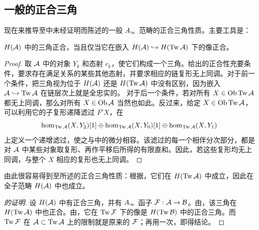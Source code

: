 \subsection{一般的正合三角}\label{sec:3r}
现在来推导至中未经证明而陈述的一般 $\Ai$ 范畴的正合三角性质。主要工具是：
\begin{lemma}\label{st:3.31}
$H(\A)$ 中的三角正合，当且仅当它在嵌入 $H(\A)\hookrightarrow H(\Tw\A)$ 下的像正合。
\end{lemma}
\begin{proof}
取 $\A$ 中的对象 $Y_k$ 和态射 $c_k$，使它们构成一个三角。给出的正合性充要条件，要求存在满足关系的某些其他态射，并要求相应的链复形无上同调。对于前一个条件，把三角视为位于 $H(\A)$ 还是 $H(\Tw\A)$ 中没有区别，因为嵌入 $\A\hookrightarrow\Tw\A$ 在链层次上就是全忠实的。
对于后一个条件，若对所有 $X\in\Ob\Tw\A$ 都无上同调，那么对所有 $X\in\Ob\A$ 当然也如此。反过来，给定 $X\in\Ob\Tw\A$，可以利用它的子复形递降滤过 $F^iX$，在
\[
\hom_{\Tw\A}(X,Y_2)[1]\oplus\hom_{\Tw\A}(X,Y_0)[1]\oplus\hom_{\Tw\A}(X,Y_1)
\]
上定义一个递增滤过，使之与中的微分相容。该滤过的每一个相伴分次部分，都是对 $\A$ 中某些对象取复形、再作平移后所得的有限直和。因此，若这些复形均无上同调，与整个 $X$ 相应的复形也无上同调。
\end{proof}
由此很容易得到至所述的正合三角性质：根据，它们在 $H(\Tw\A)$ 中成立，因此在全子范畴 $H(\A)$ 中也成立。

\begin{proof}[的证明]
设 $H(\A)$ 中有正合三角，并有 $\Ai$ 函子 $\F:\A\to\B$。由，该三角在 $H(\Tw\A)$ 中也正合。由，它在 $\Tw\F$ 下的像是 $H(\Tw\B)$ 中的正合三角。而 $\Tw\F$ 在 $\A\subset\Tw\A$ 上的限制就是原来的 $\F$；再用一次，即得结论。
\end{proof}

